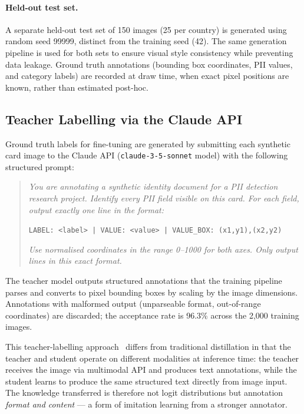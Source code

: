 \paragraph{Held-out test set.}
A separate held-out test set of 150 images (25 per
country) is generated using random seed 99999,
distinct from the training seed (42).
The same generation pipeline is used for both sets
to ensure visual style consistency while preventing
data leakage.
Ground truth annotations (bounding box coordinates,
PII values, and category labels) are recorded at
draw time, when exact pixel positions are known,
rather than estimated post-hoc.

\subsection{Teacher Labelling via the Claude API}

Ground truth labels for fine-tuning are generated by
submitting each synthetic card image to the Claude API
(\texttt{claude-3-5-sonnet} model) with the following
structured prompt:

\begin{quote}
\small
\textit{You are annotating a synthetic identity document
for a PII detection research project.
Identify every PII field visible on this card.
For each field, output exactly one line in the format:}

\texttt{LABEL: <label> | VALUE: <value> |
VALUE\_BOX: (x1,y1),(x2,y2)}

\textit{Use normalised coordinates in the range
0--1000 for both axes.
Only output lines in this exact format.}
\end{quote}

The teacher model outputs structured annotations
that the training pipeline parses and converts to
pixel bounding boxes by scaling by the image
dimensions.
Annotations with malformed output (unparseable
format, out-of-range coordinates) are discarded;
the acceptance rate is 96.3\% across the 2,000
training images.

This teacher-labelling approach~\cite{taori2023alpaca}
differs from traditional distillation in that the
teacher and student operate on different modalities
at inference time: the teacher receives the image
via multimodal API and produces text annotations,
while the student learns to produce the same
structured text directly from image input.
The knowledge transferred is therefore not logit
distributions but annotation \emph{format and
content} --- a form of imitation learning
from a stronger annotator.

